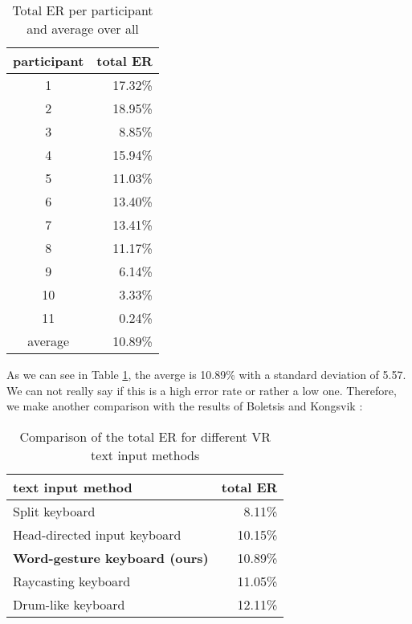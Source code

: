 \begin{table}[H]
    \centering
    \caption{Total ER per participant and average over all}
    \begin{tabular}{cr} \toprule
        participant&total ER\\ \midrule
        1&17.32\%\\
        2&18.95\%\\
        3&8.85\%\\
        4&15.94\%\\
        5&11.03\%\\
        6&13.40\%\\
        7&13.41\%\\
        8&11.17\%\\
        9&6.14\%\\
        10&3.33\%\\
        11&0.24\%\\\midrule
        average&10.89\%\\
        \bottomrule
    \end{tabular}
    \label{tab:total_er}
\end{table}
As we can see in Table \ref{tab:total_er}, the averge is 10.89\% with a standard deviation of 5.57. We can not really say if this is a high error rate or rather a low one. Therefore, we make another comparison with the results of Boletsis and Kongsvik \cite{Boletsis2019ControllerbasedTT}:
\begin{table}[H]
    \centering
    \caption{Comparison of the total ER for different VR text input methods}
    \begin{tabular}{lr} \toprule
        text input method&total ER\\ \midrule
        Split keyboard& 8.11\%\\
        Head-directed input keyboard& 10.15\%\\
        \textbf{Word-gesture keyboard (ours)}& 10.89\%\\
        Raycasting keyboard& 11.05\%\\
        Drum-like keyboard& 12.11\%\\
        \bottomrule
    \end{tabular}
    \label{tab:total_er_compare}
\end{table}

